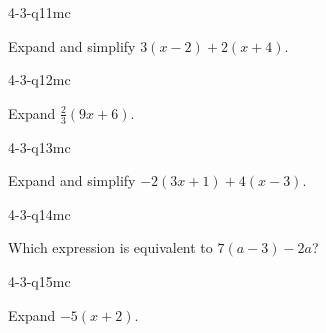 \begin{practiceQuestion}{4-3-q11}{mc}
\begin{questionText}
Expand and simplify $3(x - 2) + 2(x + 4)$.
\end{questionText}
\end{practiceQuestion}

\begin{practiceQuestion}{4-3-q12}{mc}
\begin{questionText}
Expand $\frac{2}{3}(9x + 6)$.
\end{questionText}
\end{practiceQuestion}

\begin{practiceQuestion}{4-3-q13}{mc}
\begin{questionText}
Expand and simplify $-2(3x + 1) + 4(x - 3)$.
\end{questionText}
\end{practiceQuestion}

\begin{practiceQuestion}{4-3-q14}{mc}
\begin{questionText}
Which expression is equivalent to $7(a - 3) - 2a$?
\end{questionText}
\end{practiceQuestion}

\begin{practiceQuestion}{4-3-q15}{mc}
\begin{questionText}
Expand $-5(x + 2)$.
\end{questionText}
\end{practiceQuestion}

